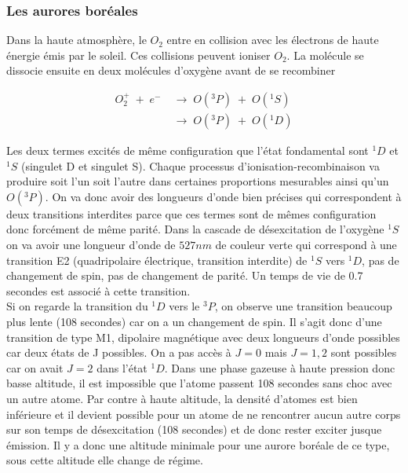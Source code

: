     \subsubsection{Les aurores boréales}




Dans la haute atmosphère, le $O_2$ entre en collision avec les électrons de haute énergie émis par le soleil. Ces collisions peuvent ioniser $O_2$. La molécule se dissocie ensuite en deux molécules d'oxygène avant de se recombiner

\begin{align*}
    O_2^+ \; + \; e^- \; &\longrightarrow \;O(^3P)\; +\; O(^1S)  \\
    &\longrightarrow\; O(^3P)\; +\; O(^1D)
\end{align*}

Les deux termes excités de même configuration que l'état fondamental sont $^1D$ et $^1S$ (singulet D et singulet S). Chaque processus d'ionisation-recombinaison va produire soit l'un soit l'autre dans certaines proportions mesurables ainsi qu'un $O(^3P)$. On va donc avoir des longueurs d'onde bien précises qui correspondent à deux transitions interdites parce que ces termes sont de mêmes configuration donc forcément de même parité. Dans la cascade de désexcitation de l'oxygène $^1S$ on va avoir une longueur d'onde de $527nm$ de couleur verte qui correspond à une transition E2 (quadripolaire électrique, transition interdite) de  $^1S$ vers $^1D$, pas de changement de spin, pas de changement de parité. Un temps de vie de 0.7 secondes est associé à cette transition.\\

Si on regarde la transition du $^1D$ vers le $^3P$, on observe une transition beaucoup plus lente (108 secondes) car on a un changement de spin. Il s'agit donc d'une transition de type M1, dipolaire magnétique avec deux longueurs d'onde possibles car deux états de J possibles. On a pas accès à $J=0$ mais $J=1,2$ sont possibles car on avait $J=2$ dans l'état $^1D$. Dans une phase gazeuse à haute pression donc basse altitude, il est impossible que l'atome passent 108 secondes sans choc avec un autre atome. Par contre à haute altitude, la densité d'atomes est bien inférieure et il devient possible pour un atome de ne rencontrer aucun autre corps sur son temps de désexcitation (108 secondes) et de donc rester exciter jusque émission. Il y a donc une altitude minimale pour une aurore boréale de ce type, sous cette altitude elle change de régime.\\

